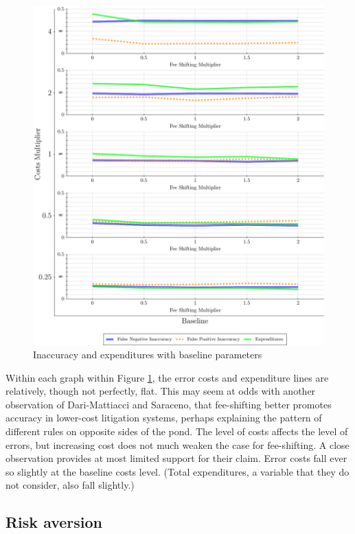 \documentclass{article}
\begin{document}
\begin{figure}[h!]
\centering
\includegraphics[scale=0.50, trim={0in 0in 0in 0in}, clip]{../Figures/Accuracy and Expenditures Baseline.pdf}
\caption{Inaccuracy and expenditures with baseline parameters}
\label{fig:accexp_baseline}
\end{figure}

Within each graph within Figure \ref{fig:accexp_baseline}, the error costs and expenditure lines are relatively, though not perfectly, flat. This may seem at odds with another observation of Dari-Mattiacci and Saraceno, that fee-shifting better promotes accuracy in lower-cost litigation systems, perhaps explaining the pattern of different rules on opposite sides of the pond. The level of costs affects the level of errors, but increasing cost does not much weaken the case for fee-shifting. A close observation provides at most limited support for their claim. Error costs fall ever so slightly at the baseline costs level. (Total expenditures, a variable that they do not consider, also fall slightly.) 

\subsection{Risk aversion}
\end{document}
